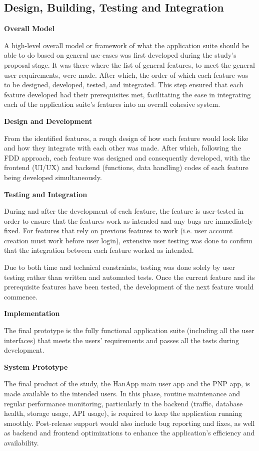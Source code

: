 \subsection{Design, Building, Testing and Integration}

\textbf{Overall Model}

A high-level overall model or framework of what the application suite should be able to do based on general use-cases was first developed during the study’s proposal stage. It was there where the list of general features, to meet the general user requirements, were made. After which, the order of which each feature was to be designed, developed, tested, and integrated. This step ensured that each feature developed had their prerequisites met, facilitating the ease in integrating each of the application suite’s features into an overall cohesive system.

\textbf{Design and Development}

From the identified features, a rough design of how each feature would look like and how they integrate with each other was made. After which, following the FDD approach, each feature was designed and consequently developed, with the frontend (UI/UX) and backend (functions, data handling) codes of each feature being developed simultaneously.

\textbf{Testing and Integration}

During and after the development of each feature, the feature is user-tested in order to ensure that the features work as intended and any bugs are immediately fixed. For features that rely on previous features to work (i.e. user account creation must work before user login), extensive user testing was done to confirm that the integration between each feature worked as intended. 

Due to both time and technical constraints, testing was done solely by user testing rather than written and automated tests. Once the current feature and its prerequisite features have been tested, the development of the next feature would commence.

\textbf{Implementation}

The final prototype is the fully functional application suite (including all the user interfaces) that meets the users’ requirements and passes all the tests during development.

\textbf{System Prototype}

The final product of the study, the HanApp main user app and the PNP app, is made available to the intended users. In this phase, routine maintenance and regular performance monitoring, particularly in the backend (traffic, database health, storage usage, API usage), is required to keep the application running smoothly. Post-release support would also include bug reporting and fixes, as well as backend and frontend optimizations to enhance the application’s efficiency and availability.

